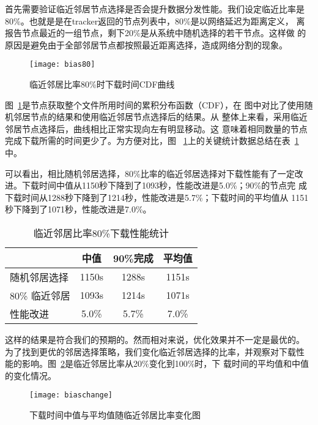 首先需要验证临近邻居节点选择是否会提升数据分发性能。我们设定临近比率是
80\%。也就是是在tracker返回的节点列表中，80\%是以网络延迟为距离定义，
离报告节点最近的一组节点，剩下20\%是从系统中随机选择的若干节点。这样做
的原因是避免由于全部邻居节点都按照最近距离选择，造成网络分割的现象。

\begin{figure}
  \centering
  \begin{minipage}{0.8\linewidth}
    \centering
    \texttt{[image: bias80]}
    \caption{临近邻居比率80\%时下载时间CDF曲线}
    \label{fig:bias80}
  \end{minipage}
\end{figure}

图~\ref{fig:bias80}是节点获取整个文件所用时间的累积分布函数（CDF），在
图中对比了使用随机邻居节点的结果和使用临近邻居节点选择后的结果。从
整体上来看，采用临近邻居节点选择后，曲线相比正常实现向左有明显移动。这
意味着相同数量的节点完成下载所需的时间更少了。为方便对比，图~
\ref{fig:bias80}上的关键统计数据总结在表~\ref{tbl:bias80}中。

可以看出，相比随机邻居选择，80\%比率的临近邻居选择对下载性能有了一定改
进。下载时间中值从1150秒下降到了1093秒，性能改进是5.0\%；90\%的节点完
成下载时间从1288秒下降到了1214秒，性能改进是5.7\%；下载时间的平均值从
1151秒下降到了1071秒，性能改进是7.0\%。

\begin{table}
\centering
\begin{minipage}{0.8\linewidth}
\centering
\caption{临近邻居比率80\%下载性能统计}
\label{tbl:bias80}
\begin{tabular}{lccc}

\toprule[1.5pt]
    & 中值 & 90\%完成 & 平均值\\
\midrule[1pt]
随机邻居选择  & 1150s & 1288s & 1151s\\
80\% 临近邻居 & 1093s & 1214s & 1071s\\
性能改进      & 5.0\% & 5.7\% & 7.0\%\\
\bottomrule[1.5pt]
\end{tabular}
\end{minipage}
\end{table}

这样的结果是符合我们的预期的。然而相对来说，优化效果并不一定是最优的。
为了找到更优的邻居选择策略，我们变化临近邻居选择的比率，并观察对下载性
能的影响。图~\ref{fig:biaschange}是临近邻居比率从20\%变化到100\%时，下
载时间的平均值和中值的变化情况。

\begin{figure}
  \centering
  \begin{minipage}{0.8\linewidth}
    \centering
    \texttt{[image: biaschange]}
    \caption{下载时间中值与平均值随临近邻居比率变化图}
    \label{fig:biaschange}
  \end{minipage}
\end{figure}

